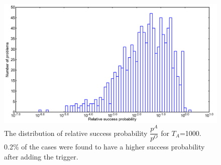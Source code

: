 \documentclass[12]{article}
\begin{document}
\begin{figure}[H]
\centering 
\includegraphics[scale=0.3]{A_T1000_g0.png}
\caption{The distribution of relative success probability $\dfrac{p^A}{p^O}$ for $T_A$=1000. 0.2\% of the cases were found to have a higher success probability after adding the trigger.}
\label{fig:a12}
\end{figure}
\end{document}
